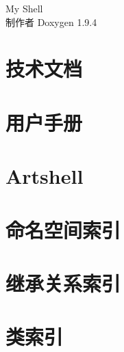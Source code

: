 \documentclass[twoside]{book}
\newcommand{\+}{\discretionary{\mbox{\scriptsize$\hookleftarrow$}}{}{}}
\newcommand{\clearemptydoublepage}{%
    \newpage{\pagestyle{empty}\cleardoublepage}%
  }
\begin{document}
  \raggedbottom
  \begin{CJK}{UTF8}{gbsn}
    \hypersetup{pageanchor=false,
                bookmarksnumbered=true,
                pdfencoding=unicode
               }
  \begin{titlepage}
  \vspace*{7cm}
  \begin{center}%
  {\Large My Shell}\\
  \vspace*{1cm}
  {\large 制作者 Doxygen 1.9.4}\\
  \end{center}
  \end{titlepage}
  \clearemptydoublepage
  \tableofcontents
  \clearemptydoublepage
  \hypersetup{pageanchor=true}
\chapter{技术文档}
\label{md_doc__xE6_x8A_x80_xE6_x9C_xAF_xE6_x96_x87_xE6_xA1_xA3}

\chapter{用户手册}
\label{md_doc__xE7_x94_xA8_xE6_x88_xB7_xE6_x89_x8B_xE5_x86_x8C}

\chapter{Artshell}
\label{md__r_e_a_d_m_e}

\chapter{命名空间索引}

\chapter{继承关系索引}

\chapter{类索引}


\end{CJK}
\end{document}
